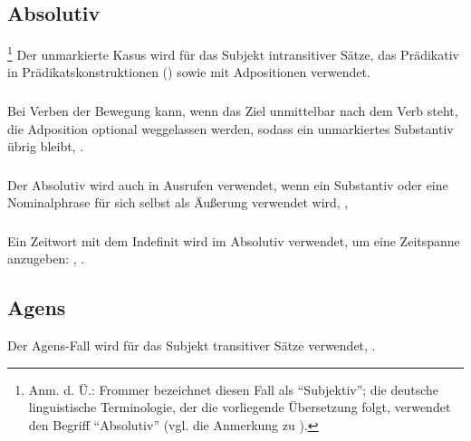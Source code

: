 \subsection{Absolutiv}\footnote{Anm. d. Ü.: Frommer bezeichnet diesen Fall als ``Subjektiv''; die deutsche linguistische Terminologie, der die vorliegende Übersetzung folgt, verwendet den Begriff ``Absolutiv'' (vgl. die Anmerkung zu ).} Der unmarkierte Kasus wird für das Subjekt intransitiver Sätze, das Prädikativ in Prädikatskonstruktionen () sowie mit Adpositionen verwendet. 

\subsubsection{} Bei Verben der Bewegung kann, wenn das Ziel unmittelbar nach dem Verb steht, die Adposition  optional weggelassen werden, sodass ein unmarkiertes Substantiv übrig bleibt,  . \label{syn:subjective:ne}

\subsubsection{} Der Absolutiv wird auch in Ausrufen verwendet, wenn ein Substantiv oder eine Nominalphrase für sich selbst als Äußerung verwendet wird,  ,  

\subsubsection{} Ein Zeitwort mit dem Indefinit  wird im Absolutiv verwendet, um eine Zeitspanne anzugeben:  ,  .

\subsection{Agens} Der Agens-Fall wird für das Subjekt transitiver Sätze verwendet,  .

